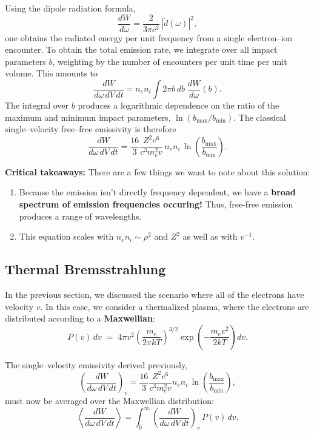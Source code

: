 Using the dipole radiation formula,
\[
    \frac{dW}{d\omega}
    = \frac{2}{3\pi c^3} \, |\ddot{d}(\omega)|^2,
\]
one obtains the radiated energy per unit frequency from a single
electron–ion encounter. To obtain the total emission rate, we integrate over all impact
parameters $b$, weighting by the number of encounters per unit time per
unit volume. This amounts to
\[
    \frac{dW}{d\omega\, dV\, dt}
    = n_e n_i \int 2\pi b\,db \;\frac{dW}{d\omega}(b).
\]
The integral over $b$ produces a logarithmic dependence on the ratio of
the maximum and minimum impact parameters, $\ln(b_{\max}/b_{\min})$.
The classical single–velocity free–free emissivity is therefore
\begin{equation}
\boxed{
    \frac{dW}{d\omega\, dV\, dt}
    = \frac{16}{3} \frac{Z^2 e^6}{c^3 m_e^2 v}\,
      n_e n_i \,\ln\!\left(\frac{b_{\max}}{b_{\min}}\right).}
\end{equation}
\begin{remark}
    \textbf{Critical takeaways:} There are a few things we want to note about this solution:
    \begin{enumerate}
        \item Because the emission isn't directly frequency dependent, we have a \textbf{broad spectrum of emission frequencies occuring!} Thus, free-free emission produces a range of wavelengths.
        \item This equation scales with $n_en_i \sim \rho^2$ and $Z^2$ as well as with $v^{-1}$.
    \end{enumerate}
\end{remark}

\subsection{Thermal Bremsstrahlung}

In the previous section, we discussed the scenario where all of the
electrons have velocity $v$. In this case, we consider a thermalized
plasma, where the electrons are distributed according to a
\textbf{Maxwellian}:
\[
    P(v)\,dv \;=\; 4\pi v^2
    \left(\frac{m_e}{2\pi kT}\right)^{3/2}
    \exp\!\left(-\frac{m_e v^2}{2kT}\right)dv.
\]

The single--velocity emissivity derived previously,
\[
    \left(\frac{dW}{d\omega\, dV\, dt}\right)_v
    = \frac{16}{3} \frac{Z^2 e^6}{c^3 m_e^2 v}
      n_e n_i \,\ln\!\left(\frac{b_{\max}}{b_{\min}}\right),
\]
must now be averaged over the Maxwellian distribution:
\[
    \left\langle \frac{dW}{d\omega\, dV\, dt}\right\rangle
    = \int_0^\infty \left(\frac{dW}{d\omega\, dV\, dt}\right)_v \, P(v)\,dv.
\]

